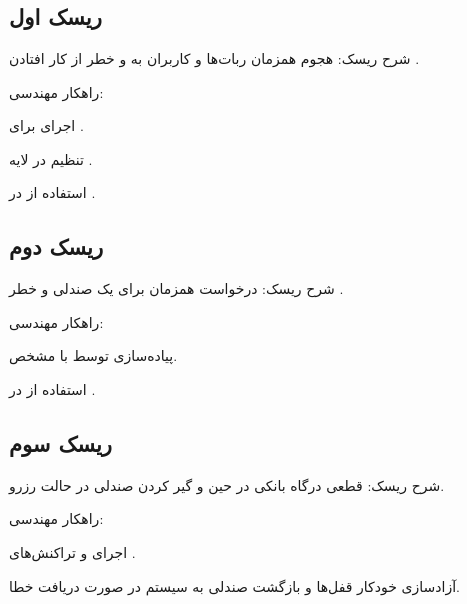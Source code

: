 \documentclass{article}
\begin{document}
\vspace{1cm}

\section{}

\subsection{ریسک اول }

شرح ریسک: هجوم همزمان ربات‌ها و کاربران به  و خطر از کار افتادن .

راهکار مهندسی:

\begin{description}[font=$\bullet$~\normalsize\scshape]
\item اجرای  برای .
\item تنظیم  در لایه .
\item استفاده از  در .
\end{description}

\subsection{ریسک دوم }

شرح ریسک: درخواست همزمان برای یک صندلی و خطر .

راهکار مهندسی:

\begin{description}[font=$\bullet$~\normalsize\scshape]
\item پیاده‌سازی  توسط  با  مشخص.
\item استفاده از  در .
\end{description}

\subsection{ریسک سوم }

شرح ریسک: قطعی درگاه بانکی در حین  و گیر کردن صندلی در حالت رزرو.

راهکار مهندسی:

\begin{description}[font=$\bullet$~\normalsize\scshape]
\item اجرای  و تراکنش‌های .
\item آزادسازی خودکار قفل‌ها و بازگشت صندلی به سیستم در صورت دریافت خطا.
\end{description}
\end{document}
